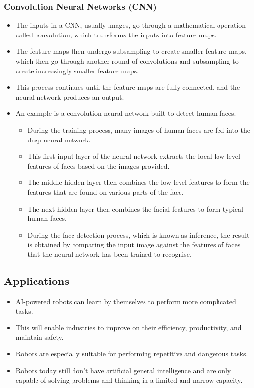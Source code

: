 \documentclass[11pt]{article}
\begin{document}
\subsubsection{Convolution Neural Networks (CNN)}
\label{sec:org7afe8c9}
\begin{itemize}
\item The inputs in a CNN, usually images, go through a mathematical operation called convolution, which transforms the inputs into feature maps.
\item The feature maps then undergo subsampling to create smaller feature maps, which then go through another round of convolutions and subsampling to create increasingly smaller feature maps.
\item This process continues until the feature maps are fully connected, and the neural network produces an output.
\item An example is a convolution neural network built to detect human faces.
\begin{itemize}
\item During the training process, many images of human faces are fed into the deep neural network.
\item This first input layer of the neural network extracts the local low-level features of faces based on the images provided.
\item The middle hidden layer then combines the low-level features to form the features that are found on various parts of the face.
\item The next hidden layer then combines the facial features to form typical human faces.
\item During the face detection process, which is known as inference, the result is obtained by comparing the input image against the features of faces that the neural network has been trained to recognise.
\end{itemize}
\end{itemize}

\clearpage
\subsection{Applications}
\label{sec:orgd94380b}
\begin{itemize}
\item AI-powered robots can learn by themselves to perform more complicated tasks.
\item This will enable industries to improve on their efficiency, productivity, and maintain safety.
\item Robots are especially suitable for performing repetitive and dangerous tasks.
\item Robots today still don't have artificial general intelligence and are only capable of solving problems and thinking in a limited and narrow capacity.
\end{itemize}
\end{document}
